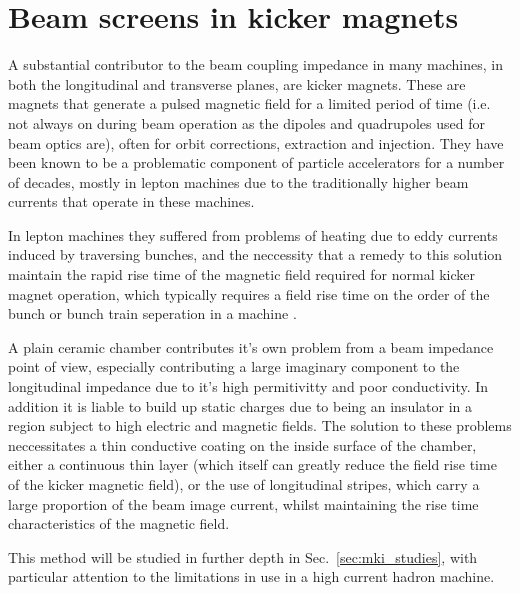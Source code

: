 \section{Beam screens in kicker magnets}
\label{sec:beam_screens}

A substantial contributor to the beam coupling impedance in many machines, in both the longitudinal and transverse planes, are kicker magnets. These are magnets that generate a pulsed magnetic field for a limited period of time (i.e. not always on during beam operation as the dipoles and quadrupoles used for beam optics are), often for orbit corrections, extraction and injection. They have been known to be a problematic component of particle accelerators for a number of decades, mostly in lepton machines due to the traditionally higher beam currents that operate in these machines.

In lepton machines they suffered from problems of heating due to eddy currents induced by traversing bunches, and the neccessity that a remedy to this solution maintain the rapid rise time of the magnetic field required for normal kicker magnet operation, which typically requires a field rise time on the order of the bunch or bunch train seperation in a machine \cite{Caspers:ThinCondLayer}. 

A plain ceramic chamber contributes it's own problem from a beam impedance point of view, especially contributing a large imaginary component to the longitudinal impedance due to it's high permitivitty and poor conductivity. In addition it is liable to build up static charges due to being an insulator in a region subject to high electric and magnetic fields. The solution to these problems neccessitates a thin conductive coating on the inside surface of the chamber, either a continuous thin layer (which itself can greatly reduce the field rise time of the kicker magnetic field), or the use of longitudinal stripes, which carry a large proportion of the beam image current, whilst maintaining the rise time characteristics of the magnetic field.

This method will be studied in further depth in Sec.~\ref{sec:mki_studies}, with particular attention to the limitations in use in a high current hadron machine.
